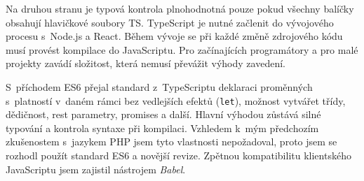 Na druhou stranu je typová kontrola plnohodnotná pouze pokud všechny balíčky obsahují hlavičkové soubory TS. TypeScript je nutné začlenit do vývojového procesu s~Node.js a React. Během vývoje se při každé změně zdrojového kódu musí provést kompilace do JavaScriptu. Pro začínajících programátory a pro malé projekty zavádí složitost, která nemusí převážit výhody zavedení.

S~příchodem ES6 přejal standard z~TypeScriptu deklaraci proměnných s~platností v~daném rámci bez vedlejších efektů (\texttt{let}), možnost vytvářet třídy, dědičnost, rest parametry, promises a další. Hlavní výhodou zůstává silné typování a kontrola syntaxe při kompilaci. Vzhledem k~mým předchozím zkušenostem s~jazykem PHP jsem tyto vlastnosti nepožadoval, proto jsem se rozhodl použít standard ES6 a novější revize. Zpětnou kompatibilitu klientského JavaScriptu jsem zajistil nástrojem \textit{Babel}.

